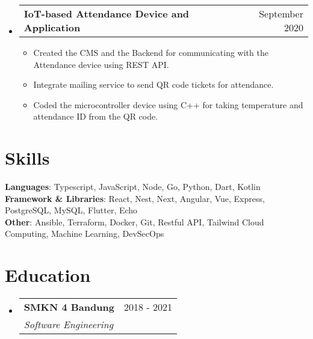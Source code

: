 \documentclass[a4paper,11pt]{article}
\makeatletter
\newcommand{\resumeSubheading}[4]{
  \vspace{-2pt}
\item
  \begin{tabular*}{0.97\textwidth}[t]{l@{\extracolsep{\fill}}r}
    \textbf{#1} & #2 \\
    \textit{\small#3} & \textit{\small #4} \\
  \end{tabular*}\vspace{-8pt}
}
\newcommand{\resumeProjectHeading}[2]{
\item
  \begin{tabular*}{0.97\textwidth}{l@{\extracolsep{\fill}}r}
    \small\textbf{#1} & #2 \\
  \end{tabular*}\vspace{-8pt}
}
\makeatother
\begin{document}
\begin{itemize}[leftmargin=0.15in, label={}]
    \resumeProjectHeading{IoT-based Attendance Device and Application}{September 2020}{}{}
    \begin{itemize}
      \item Created the CMS and the Backend for communicating with the Attendance device using REST API.
      \item Integrate mailing service to send QR code tickets for attendance.
      \item Coded the microcontroller device using C++ for taking temperature and attendance ID from the QR code.
    \end{itemize}\vspace{-8pt}

\end{itemize}

\section{Skills}
\begin{itemize}[leftmargin=0.15in, label={}]
    \small{
    \item{
        \vspace{1mm}
        \textbf{Languages}{: Typescript, JavaScript, Node, Go, Python, Dart, Kotlin} \\
        \textbf{Framework \& Libraries}{: React, Nest, Next, Angular, Vue, Express,  PostgreSQL, MySQL, Flutter, Echo } \\
        \textbf{Other}{: Ansible, Terraform, Docker, Git, Restful API, Tailwind Cloud Computing, Machine Learning, DevSecOps} \\
      }
    }
\end{itemize}

\section{Education}
\begin{itemize}[leftmargin=0.15in, label={}]
    \resumeSubheading{SMKN 4 Bandung}{2018 - 2021}{Software Engineering}{}
\end{itemize}
\end{document}
